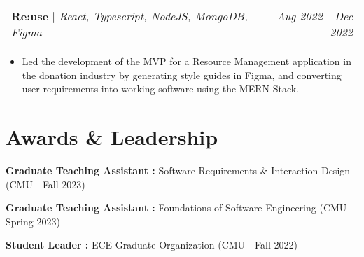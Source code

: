 \documentclass[letterpaper]{article}
\makeatletter
\newcommand{\resumeItemWithoutTitle}[1]{
  \item\small{
    {#1 \vspace{-2pt}}
  }
}
\newcommand{\shortSection}[1]{
    \vspace{-6pt}
    \section{#1}
}
\newcommand{\projectHeading}[3]{
  \begin{tabular*}{\textwidth}{l@{\extracolsep{\fill}}r}
        \textbf{#1} 
        \hspace{-2pt} $\vert$ \hspace{-2pt} \small{\textit{#2}} 
        & 
        \textit{#3} \\
    \end{tabular*}\vspace{-2pt}
}
\newcommand*{\skill}[2]{
  \textbf{#1 : }#2 \\
  \vspace{1pt}
}
\newcommand{\resumeItemListStart}{\begin{itemize}}
\newcommand{\resumeItemListEnd}{\end{itemize}}
\makeatother
\begin{document}
\vspace{3pt}
\projectHeading {Re:use}{React, Typescript, NodeJS, MongoDB, Figma}{Aug 2022 - Dec 2022}
\resumeItemListStart
\resumeItemWithoutTitle{Led the development of the MVP for a Resource Management application in the donation industry by generating style guides in Figma, and converting user requirements into working software using the MERN Stack.}
\resumeItemListEnd


\shortSection{Awards \& Leadership}
\skill{Graduate Teaching Assistant}{Software Requirements \& Interaction Design (CMU - Fall 2023)}
\skill{Graduate Teaching Assistant}{Foundations of Software Engineering (CMU - Spring 2023)}
\skill{Student Leader}{ECE Graduate Organization (CMU - Fall 2022)}
\end{document}
